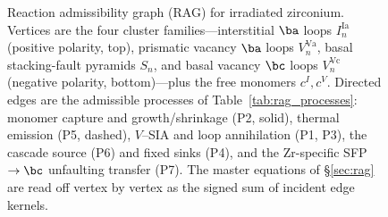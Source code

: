 \begin{figure}[htbp]
\caption{Reaction admissibility graph (\textsc{RAG}) for irradiated
zirconium. Vertices are the four cluster families---interstitial $\ba$
loops $I_n^{\mathrm{Ia}}$ (positive polarity, top), prismatic vacancy
$\ba$ loops $V_n^{\mathrm{Va}}$, basal stacking-fault pyramids $S_n$, and
basal vacancy $\bc$ loops $V_n^{\mathrm{Vc}}$ (negative polarity,
bottom)---plus the free monomers $c^{I},c^{V}$. Directed edges are the
admissible processes of Table~\ref{tab:rag_processes}: monomer capture
and growth/shrinkage (P2, solid), thermal emission (P5, dashed),
$V$--SIA and loop annihilation (P1, P3), the cascade source (P6) and
fixed sinks (P4), and the Zr-specific SFP$\to\bc$ unfaulting transfer
(P7). The master equations of \S\ref{sec:rag} are read off vertex by
vertex as the signed sum of incident edge kernels.}
\label{fig:rag_zr}
\end{figure}

